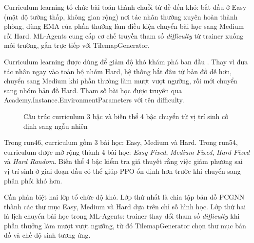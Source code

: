 Curriculum learning tổ chức bài toán thành chuỗi từ dễ đến khó: bắt đầu ở Easy (mật độ tường thấp, không gian rộng) nơi tác nhân thường xuyên hoàn thành phòng, dùng EMA của phần thưởng làm điều kiện chuyển bài học sang Medium rồi Hard. ML-Agents cung cấp cơ chế truyền tham số \emph{difficulty} từ trainer xuống môi trường, gắn trực tiếp với TilemapGenerator.

Curriculum learning được dùng để giảm độ khó khám phá ban đầu \cite{Bengio2009}. Thay vì đưa tác nhân ngay vào toàn bộ nhóm Hard, hệ thống bắt đầu từ bản đồ dễ hơn, chuyển sang Medium khi phần thưởng làm mượt vượt ngưỡng, rồi mới chuyển sang nhóm bản đồ Hard. Tham số bài học được truyền qua Academy.Instance.EnvironmentParameters với tên difficulty.

\begin{figure}[H]
    \centering
    \caption{Cấu trúc curriculum 3 bậc và biến thể 4 bậc chuyển từ vị trí sinh cố định sang ngẫu nhiên}
    \label{fig:curriculum_structure}
\end{figure}

Trong run46, curriculum gồm 3 bài học: Easy, Medium và Hard. Trong run54, curriculum được mở rộng thành 4 bài học: \emph{Easy Fixed}, \emph{Medium Fixed}, \emph{Hard Fixed} và \emph{Hard Random}. Biến thể 4 bậc kiểm tra giả thuyết rằng việc giảm phương sai vị trí sinh ở giai đoạn đầu có thể giúp PPO ổn định hơn trước khi chuyển sang phân phối khó hơn.

Cần phân biệt hai lớp tổ chức độ khó. Lớp thứ nhất là chia tập bản đồ PCGNN thành các thư mục Easy, Medium và Hard dựa trên chỉ số hình học. Lớp thứ hai là lịch chuyển bài học trong ML-Agents: trainer thay đổi tham số \emph{difficulty} khi phần thưởng làm mượt vượt ngưỡng, từ đó TilemapGenerator chọn thư mục bản đồ và chế độ sinh tương ứng.

